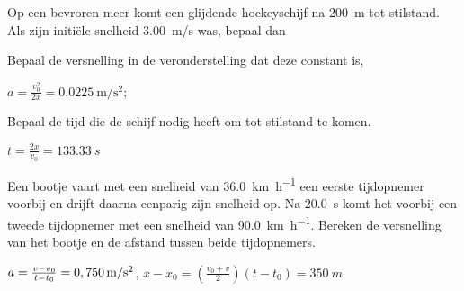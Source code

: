 \documentclass{ximera}
\begin{document}
\begin{exercise}
    Op een bevroren meer komt een glijdende hockeyschijf na \SI{200}{m} tot stilstand. Als zijn initi\"ele snelheid \SI{3,00}{m/s} was, bepaal dan
    \begin{question} Bepaal de versnelling in de veronderstelling dat deze constant is,  \begin{oplossing} $a= \frac{v_0^2}{2x}=\SI{0.0225}{\meter\per\second\squared}$;    \end{oplossing} \end{question}
    \begin{question} Bepaal de tijd die de schijf nodig heeft om tot stilstand te komen. \begin{oplossing} $t=\frac{2x}{v_0}=\SI{133,33}{s}$                                \end{oplossing} \end{question}
\end{exercise}

\begin{exercise}
    Een bootje vaart met een snelheid van \SI{36,0}{\kilo\meter\per\hour} een eerste tijdopnemer voorbij en drijft daarna eenparig zijn snelheid op. Na \SI{20,0}{s} komt het voorbij een tweede tijdopnemer met een snelheid van \SI{90,0}{\kilo\meter\per\hour}. Bereken de versnelling van het bootje en de afstand tussen beide tijdopnemers.
    \begin{oplossing}
        $a=\frac{v-v_0}{t-t_0}=0,750\rm\,m/s^2$, $x-x_0=\left(\frac{v_0+v}{2}\right)(t-t_0)=\SI{350}{m}$
    \end{oplossing}
\end{exercise}
\end{document}
